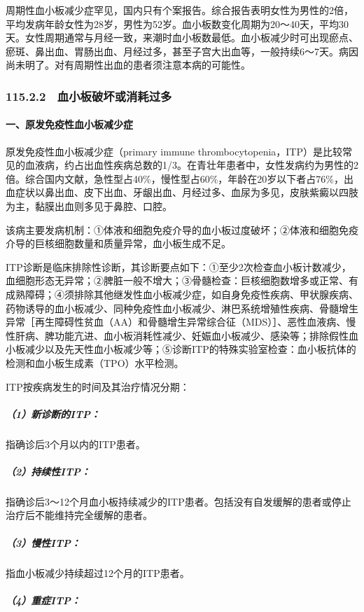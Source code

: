 周期性血小板减少症罕见，国内只有个案报告。综合报告表明女性为男性的2倍，平均发病年龄女性为28岁，男性为52岁。血小板数变化周期为20～40天，平均30天。女性周期通常与月经一致，来潮时血小板数最低。血小板减少时可出现瘀点、瘀斑、鼻出血、胃肠出血、月经过多，甚至子宫大出血等，一般持续6～7天。病因尚未明了。对有周期性出血的患者须注意本病的可能性。

\subsubsection{115.2.2　血小板破坏或消耗过多}

\paragraph{一、原发免疫性血小板减少症}

原发免疫性血小板减少症（primary immune
thrombocytopenia，ITP）是比较常见的血液病，约占出血性疾病总数的1/3。在青壮年患者中，女性发病约为男性的2倍。综合国内文献，急性型占40\%，慢性型占60\%，年龄在20岁以下者占76\%，出血症状以鼻出血、皮下出血、牙龈出血、月经过多、血尿为多见，皮肤紫癜以四肢为主，黏膜出血则多见于鼻腔、口腔。

该病主要发病机制：①体液和细胞免疫介导的血小板过度破坏；②体液和细胞免疫介导的巨核细胞数量和质量异常，血小板生成不足。

ITP诊断是临床排除性诊断，其诊断要点如下：①至少2次检查血小板计数减少，血细胞形态无异常；②脾脏一般不增大；③骨髓检查：巨核细胞数增多或正常、有成熟障碍；④须排除其他继发性血小板减少症，如自身免疫性疾病、甲状腺疾病、药物诱导的血小板减少、同种免疫性血小板减少、淋巴系统增殖性疾病、骨髓增生异常［再生障碍性贫血（AA）和骨髓增生异常综合征（MDS）］、恶性血液病、慢性肝病、脾功能亢进、血小板消耗性减少、妊娠血小板减少、感染等；排除假性血小板减少以及先天性血小板减少等；⑤诊断ITP的特殊实验室检查：血小板抗体的检测和血小板生成素（TPO）水平检测。

ITP按疾病发生的时间及其治疗情况分期：

\subparagraph{（1）新诊断的ITP：}

指确诊后3个月以内的ITP患者。

\subparagraph{（2）持续性ITP：}

指确诊后3～12个月血小板持续减少的ITP患者。包括没有自发缓解的患者或停止治疗后不能维持完全缓解的患者。

\subparagraph{（3）慢性ITP：}

指血小板减少持续超过12个月的ITP患者。

\subparagraph{（4）重症ITP：}

